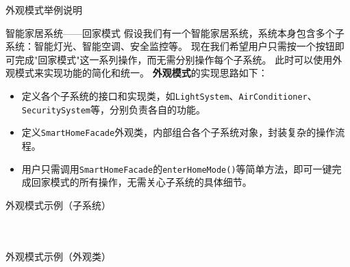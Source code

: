 \documentclass[UTF8,aspectratio=169]{beamer}
\begin{document}
\begin{frame}{外观模式举例说明}
    \begin{exampleytublock}{智能家居系统——回家模式}
        假设我们有一个智能家居系统，系统本身包含多个子系统：智能灯光、智能空调、安全监控等。
        现在我们希望用户只需按一个按钮即可完成"回家模式"这一系列操作，而无需分别操作每个子系统。
        此时可以使用外观模式来实现功能的简化和统一。
        \textbf{外观模式}的实现思路如下：
        \begin{itemize}
            \item 定义各个子系统的接口和实现类，如\texttt{LightSystem}、\texttt{AirConditioner}、\texttt{SecuritySystem}等，分别负责各自的功能。
            \item 定义\texttt{SmartHomeFacade}外观类，内部组合各个子系统对象，封装复杂的操作流程。
            \item 用户只需调用\texttt{SmartHomeFacade}的\texttt{enterHomeMode()}等简单方法，即可一键完成回家模式的所有操作，无需关心子系统的具体细节。
        \end{itemize}
    \end{exampleytublock}
\end{frame}

\begin{frame}{外观模式示例（子系统）}
    \begin{columns}
        \begin{column}{0.48\textwidth}
            \inputminted[firstline=1, lastline=15]{cpp}{code/facade_pattern.cpp}
        \end{column}
        \begin{column}{0.48\textwidth}
            \inputminted[firstline=17, lastline=32]{cpp}{code/facade_pattern.cpp}
        \end{column}
    \end{columns}
\end{frame}

\begin{frame}{外观模式示例（外观类）}
    \begin{columns}
        \begin{column}{0.48\textwidth}
            \inputminted[firstline=34, lastline=45]{cpp}{code/facade_pattern.cpp}
        \end{column}
        \begin{column}{0.48\textwidth}
            \inputminted[firstline=47, lastline=66]{cpp}{code/facade_pattern.cpp}
        \end{column}
    \end{columns}
\end{frame}
\end{document}
